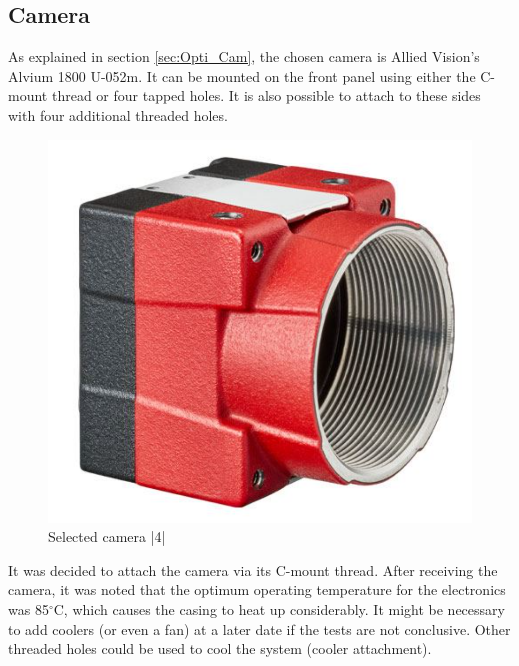 \subsection{Camera}
As explained in section \ref{sec:Opti_Cam}, the chosen camera is Allied Vision's Alvium 1800 U-052m. \newline
It can be mounted on the front panel using either the C-mount thread or four tapped 
holes. It is also possible to attach to these sides with four additional threaded holes.
\begin{figure}[H]
    \centering
    \includegraphics[scale=0.35]{assets/figures/Mechanical Design/Camera.png}
    \caption{Selected camera |4|}
    \label{fig:Camera}
\end{figure}
It was decided to attach the camera via its C-mount thread. After receiving the camera, it was noted that the 
optimum operating temperature for the electronics was 85$^\circ$C, which causes the casing to heat up considerably. 
It might be necessary to add coolers (or even a fan) at a later date if the tests are not conclusive. 
Other threaded holes could be used to cool the system (cooler attachment).
